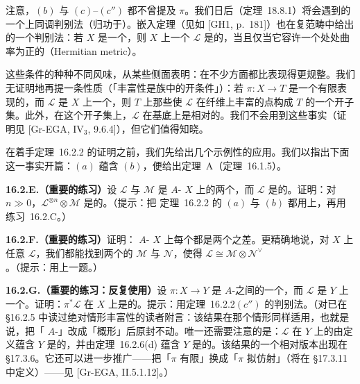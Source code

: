 注意，$(b)$ 与 $(c)$--$(c'')$ 都不曾提及\trStructureMorphism{} $\pi$。我们日后（\mbox{定理~18.8.1}）将会遇到\trAmpleness{}的一个上同调判别法（归功于\trSerre）。\trKodaira{}嵌入定理（见如 [GH1, p.~181]）也在复范畴中给出\trAmpleness{}的一个判别法：若 $X$ 是一个\trCompact\trComplex\trManifold，则 $X$ 上一个\trInvertibleSheaf{} $\mathscr{L}$ 是\trAmple{}的，当且仅当它容许一个处处曲率为正的\trHermitianMetric{}（Hermitian metric）。

这些条件的种种不同风味，从某些侧面表明：\trAmpleness{}在不少方面都比\trVeryAmpleness{}表现得更规整。我们无证明地再提一条性质（「丰富性是族中的开条件」）：若 $\pi\colon X\to T$ 是一个有限表现的\trProper\trMorphism，而 $\mathscr{L}$ 是 $X$ 上一个\trInvertibleSheaf，则 $T$ 上那些使 $\mathscr{L}$ 在纤维上丰富的点构成 $T$ 的一个开子集。此外，在这个开子集上，$\mathscr{L}$ 在基底上是相对\trAmple{}的。我们不会用到这些事实（证明见 [Gr-EGA, IV$_3$, 9.6.4]），但它们值得知晓。

在着手\mbox{定理~16.2.2} 的证明之前，我们先给出几个示例性的应用。我们以指出下面这一事实开篇：$(a)$ 蕴含 $(b)$，便给出\trSerre{}定理~A（\mbox{定理~16.1.5}）。

\textbf{16.2.E.（重要的练习）}\quad 设 $\mathscr{L}$ 与 $\mathscr{M}$ 是\trProper{} $A$-\trScheme{} $X$ 上的两个\trInvertibleSheaf，而 $\mathscr{L}$ 是\trAmple{}的。证明：对 $n\gg 0$，$\mathscr{L}^{\otimes n}\otimes\mathscr{M}$ 是\trVeryAmple{}的。（提示：把 \mbox{定理~16.2.2} 的 $(a)$ 与 $(b)$ 都用上，再用\mbox{练习~16.2.C}。）

\textbf{16.2.F.（重要的练习）}\quad 证明：\trProjective{} $A$-\trScheme{} $X$ 上每个\trLineBundle{}都是两个\trVeryAmple\trLineBundle{}之差。更精确地说，对 $X$ 上任意\trInvertibleSheaf{} $\mathscr{L}$，我们都能找到两个\trVeryAmple{}的\trInvertibleSheaf{} $\mathscr{M}$ 与 $\mathscr{N}$，使得 $\mathscr{L}\cong\mathscr{M}\otimes\mathscr{N}^{\vee}$。（提示：用上一题。）

\textbf{16.2.G.（重要的练习：反复使用）}\quad 设 $\pi\colon X\to Y$ 是\trProper{} $A$-\trScheme{}之间的一个\trFinite\trMorphism，而 $\mathscr{L}$ 是 $Y$ 上一个\trAmple\trLineBundle。证明：$\pi^*\mathscr{L}$ 在 $X$ 上是\trAmple{}的。提示：用\mbox{定理~16.2.2}$(c'')$ 的判别法。（对已在 \S16.2.5 中读过绝对情形丰富性的读者附言：该结果在那个情形同样适用，也就是说，把「\trProper{} $A$-\trScheme」改成「概形」后原封不动。唯一还需要注意的是：$\mathscr{L}$ 在 $Y$ 上的\trAmpleness{}由定义蕴含 $Y$ 是\trQuasicompact{}的，并由\mbox{定理~16.2.6}(d) 蕴含 $Y$ 是\trSeparated{}的。该结果的一个相对版本出现在 \S17.3.6。它还可以进一步推广——把「$\pi$ 有限」换成「$\pi$ 拟仿射」（将在 \S17.3.11 中定义）——见 [Gr-EGA, II.5.1.12]。）

